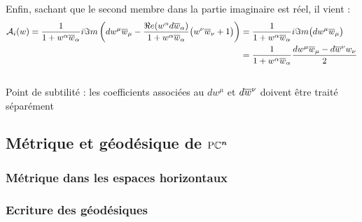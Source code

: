 \begin{annexe}
\begin{align*}
\end{align*}
\\
Enfin, sachant que le second membre dans la partie imaginaire est réel, il vient :
\begin{align*}
	\mathcal{A}_i(w) = \frac{1}{1 + w^\alpha\overline{w}_\alpha} i\Im m \left( dw^\mu\overline{w}_\mu -  \frac{\Re e(w^\alpha d\overline{w}_\alpha)}{1 + w^\alpha\overline{w}_\alpha}\big( w^\nu\overline{w}_\nu +1 \big) \right) 
	&= \frac{1}{1 + w^\alpha\overline{w}_\alpha} i\Im m \big( dw^\mu\overline{w}_\mu \big) \\
	&= \frac{1}{1 + w^\alpha\overline{w}_\alpha} \frac{dw^\mu\overline{w}_\mu -  d\overline{w}^\nu w_\nu }{2}
\end{align*}
\\

Point de subtilité : les coefficients associées au $dw^\mu$ et $d\overline{w}^\nu$ doivent être traité séparément


\subsection{Métrique et géodésique de $\boldsymbol{\text{\normalfont P}\mathbb{C}^{n}}$}


\subsubsection{Métrique dans les espaces horizontaux}

\subsubsection{Ecriture des géodésiques}


\end{annexe}
